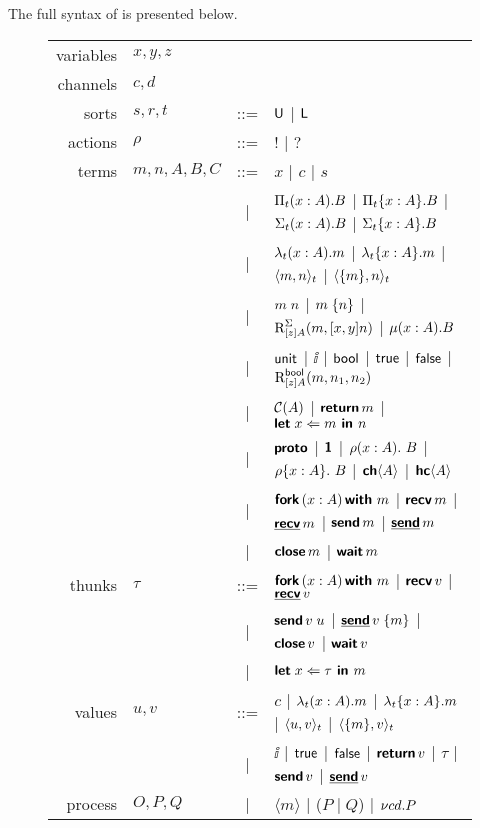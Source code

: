 The full syntax of \TLLC{} is presented below.

\begin{figure}[H]
  \begin{tabular}{r l c l}
    variables & $x, y, z$   &     &                 \\
    channels  & $c, d$      &     &                 \\
    sorts     & $s, r, t$   & ::= & $\textsf{U}$ | $\textsf{L}$   \\
    actions   & $\rho$      & ::= & $!$ | $?$       \\
    terms     & $m,n,A,B,C$ & ::= & $x$ | $c$ | $s$ \\
              &             & \;| & $\Pi_{t}({x : A}).{B}$ | $\Pi_{t}\{{x : A}\}.{B}$
                                    | $\Sigma_{t}({x : A}).{B}$ | $\Sigma_{t}\{{x : A}\}.{B}$ \\
              &             & \;| & $\lambda_{t}({x : A}).{m}$ | $\lambda_{t}\{{x : A}\}.{m}$
                                    | $\langle{{m},{n}}\rangle_{t}$ | $\langle{\{{m}\},{n}}\rangle_{t}$ \\
              &             & \;| & ${m}\;{n}$ | ${m}\;\{{n}\}$ | $\text{R}_{[z]A}^{\Sigma}({m},{[x,y]n})$ | $\mu({x : A}).{B}$ \\
              &             & \;| & $\textsf{unit}$ | $\ii$ | $\textsf{bool}$ | $\textsf{true}$ | $\textsf{false}$
                                    | $\text{R}_{[z]A}^{\textsf{bool}}({m},{n_{1}},{n_{2}})$ \\
              &             & \;| & $\mathcal{C}({A})$ | $\textbf{\textsf{return}}\,{m}$ | $\textbf{\textsf{let}}\;{x}\Leftarrow{m}\textbf{\textsf{ in }}{n}$ \\
              &             & \;| & $\textbf{\textsf{proto}}$ | $\textbf{\textsf{1}}$
                                    | ${{\rho}({x : A}).\ {B}}$ | ${{\rho}\{{x : A}\}.\ {B}}$ | ${\textbf{\textsf{ch}}\langle{A}\rangle}$ | ${\textbf{\textsf{hc}}\langle{A}\rangle}$ \\
              &             & \;| & $\textbf{\textsf{fork}}\,({x : A})\,\textbf{\textsf{with}}\ {m}$ | $\textbf{\textsf{recv}}\,{m}$ | $\underline{\textbf{\textsf{recv}}}\,{m}$
                                    | $\textbf{\textsf{send}}\,{m}$ | $\underline{\textbf{\textsf{send}}}\,{m}$ \\
              &             & \;| & $\textbf{\textsf{close}}\,{m}$ | $\textbf{\textsf{wait}}\,{m}$ \\
    thunks    & $\tau$         & ::= & $\textbf{\textsf{fork}}\,({x : A})\,\textbf{\textsf{with}}\ {m}$ | $\textbf{\textsf{recv}}\,{v}$ | $\underline{\textbf{\textsf{recv}}}\,{v}$  \\
              &             & \;| & ${\textbf{\textsf{send}}\,{v}}\;{u}$ | ${\underline{\textbf{\textsf{send}}}\,{v}}\;\{{m}\}$ | $\textbf{\textsf{close}}\,{v}$ | $\textbf{\textsf{wait}}\,{v}$ \\
              &             & \;| & $\textbf{\textsf{let}}\;{x}\Leftarrow{\tau}\textbf{\textsf{ in }}{m}$ \\ 
    values    & $u, v$      & ::= & $c$ | $\lambda_{t}({x : A}).{m}$ | $\lambda_{t}\{{x : A}\}.{m}$
                                    | $\langle{{u},{v}}\rangle_{t}$ | $\langle{\{{m}\},{v}}\rangle_{t}$ \\
              &             & \;| & $\ii$ | $\textsf{true}$ | $\textsf{false}$ | $\textbf{\textsf{return}}\,{v}$ | $\tau$ | $\textbf{\textsf{send}}\,{v}$ | $\underline{\textbf{\textsf{send}}}\,{v}$ \\
    process   & $O, P, Q$   & \;| & $\langle m \rangle$ | ($P \mid Q$) | ${\nu{cd}.{P}}$
  \end{tabular}
\end{figure}

